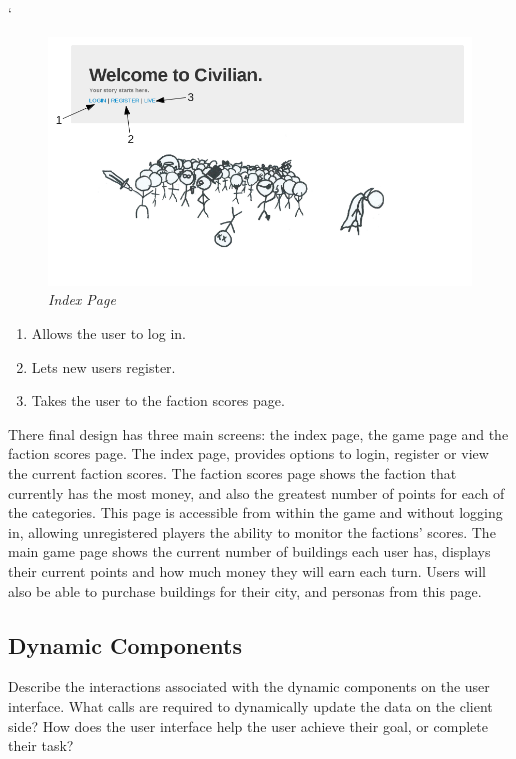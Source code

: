 `\documentclass{sig-alt-release2}
\begin{document}
\begin{figure}[!htbp]
  \caption{\textit{Index Page}}
  \begin{center}
		\includegraphics[scale=0.30]{img/indexlabel.png}
  \end{center}
\end{figure}

\begin{enumerate}
\item Allows the user to log in.
\item Lets new users register.
\item Takes the user to the faction scores page.
\end{enumerate}

There final design has three main screens: the index page, the game page and the faction scores page. The index  page, provides options to login, register or view the current faction scores. The faction scores page shows the faction that currently has the most money, and also the greatest number of points for each of the categories. This page is accessible from within the game and without logging in, allowing unregistered players the ability to monitor the factions' scores. The main game page shows the current number of buildings each user has, displays their current points and how much money they will earn each turn. Users will also be able to purchase buildings for their city, and personas from this page. 

\subsection{Dynamic Components}

Describe the interactions associated with the dynamic components on the user interface.
What calls are required to dynamically update the data on the client side?
How does the user interface help the user achieve their goal, or complete their task? 
\end{document}
